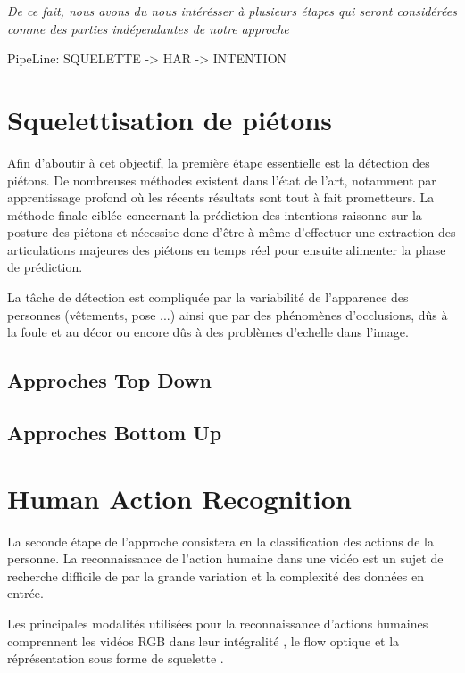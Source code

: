 \textit{De ce fait, nous avons du nous intérésser à plusieurs étapes qui seront considérées comme des parties indépendantes de notre approche}


PipeLine: SQUELETTE -> HAR -> INTENTION

\section{Squelettisation de piétons}

Afin d’aboutir à cet objectif, la première étape essentielle est la détection des piétons. De nombreuses méthodes existent dans l’état de l’art, notamment par apprentissage profond où les récents résultats sont tout à fait prometteurs. La méthode finale ciblée concernant la prédiction des intentions raisonne sur la posture des piétons et nécessite donc d’être à même d’effectuer une extraction des articulations majeures des piétons en temps réel pour ensuite alimenter la phase de prédiction.

La tâche de détection est compliquée par la variabilité de l’apparence des personnes (vêtements, pose ...)
ainsi que par des phénomènes d’occlusions, dûs à la foule et au décor ou encore dûs à des problèmes d'echelle dans l'image.



\label{subsec:SQUEL}
\subsection{Approches Top Down}
\subsection{Approches Bottom Up}

\section{Human Action Recognition}
\label{subsec:HAR}

La seconde étape de l'approche consistera en la classification des actions de la personne. La reconnaissance de l'action humaine dans une vidéo est un sujet de recherche difficile de par la grande variation et la complexité des données en entrée.

Les principales modalités utilisées pour la reconnaissance d'actions humaines comprennent les vidéos RGB dans leur intégralité \cite{donahue2015long,2014arXiv1412.0767T,varol2017long,Wu_2018_CVPR}, le flow optique \cite{simonyan2014two,zhang2016real,sevilla2018integration,DanutPOP} et la réprésentation sous forme de squelette \cite{vemulapalli2014human,du2015hierarchical,2016arXiv160707043L,2018arXiv180107455Y}.

